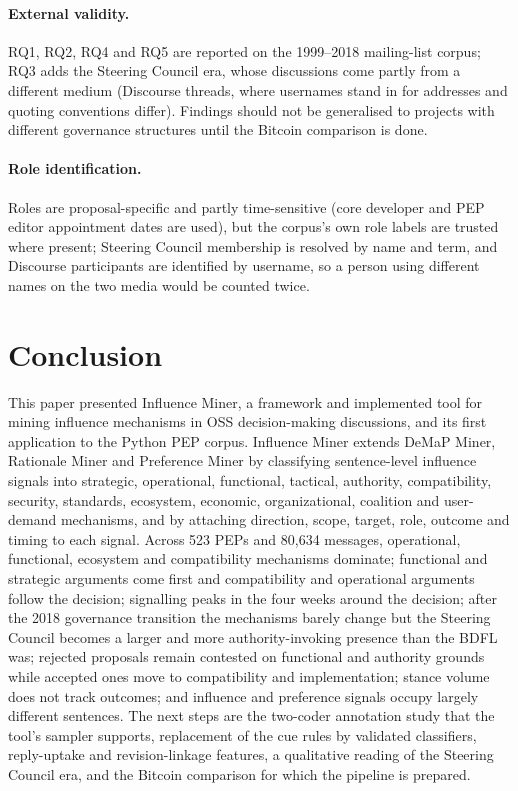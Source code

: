 \documentclass[sigconf,screen]{acmart}
\begin{document}
\paragraph{External validity.} RQ1, RQ2, RQ4 and RQ5 are reported on the 1999--2018 mailing-list corpus; RQ3 adds the Steering Council era, whose discussions come partly from a different medium (Discourse threads, where usernames stand in for addresses and quoting conventions differ). Findings should not be generalised to projects with different governance structures until the Bitcoin comparison is done.

\paragraph{Role identification.} Roles are proposal-specific and partly time-sensitive (core developer and PEP editor appointment dates are used), but the corpus's own role labels are trusted where present; Steering Council membership is resolved by name and term, and Discourse participants are identified by username, so a person using different names on the two media would be counted twice.

\section{Conclusion}

This paper presented Influence Miner, a framework and implemented tool for mining influence mechanisms in OSS decision-making discussions, and its first application to the Python PEP corpus. Influence Miner extends DeMaP Miner, Rationale Miner and Preference Miner by classifying sentence-level influence signals into strategic, operational, functional, tactical, authority, compatibility, security, standards, ecosystem, economic, organizational, coalition and user-demand mechanisms, and by attaching direction, scope, target, role, outcome and timing to each signal. Across 523 PEPs and 80,634 messages, operational, functional, ecosystem and compatibility mechanisms dominate; functional and strategic arguments come first and compatibility and operational arguments follow the decision; signalling peaks in the four weeks around the decision; after the 2018 governance transition the mechanisms barely change but the Steering Council becomes a larger and more authority-invoking presence than the BDFL was; rejected proposals remain contested on functional and authority grounds while accepted ones move to compatibility and implementation; stance volume does not track outcomes; and influence and preference signals occupy largely different sentences. The next steps are the two-coder annotation study that the tool's sampler supports, replacement of the cue rules by validated classifiers, reply-uptake and revision-linkage features, a qualitative reading of the Steering Council era, and the Bitcoin comparison for which the pipeline is prepared.
\end{document}
